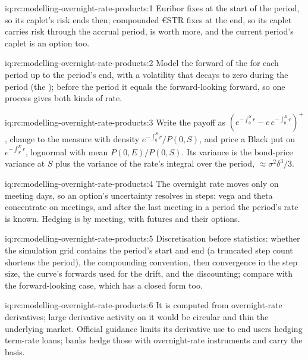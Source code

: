 \begin{solution}{iq:rc:modelling-overnight-rate-products:1}
Euribor fixes at the start of the period, so its caplet's risk ends then;
compounded €STR fixes at the end, so its caplet carries risk through the accrual
period, is worth more, and the current period's caplet is an option too.
\end{solution}

\begin{solution}{iq:rc:modelling-overnight-rate-products:2}
Model the forward of the  for each period up to the period's
end, with a volatility that decays to zero during the period (the ); before the period it equals the forward-looking forward, so
one process gives both kinds of rate.
\end{solution}

\begin{solution}{iq:rc:modelling-overnight-rate-products:3}
Write the payoff as $(e^{-\int_0^Sr}-c\,e^{-\int_0^Er})^+$, change to the measure with
density $e^{-\int_0^Sr}/P(0,S)$, and price a Black put on $e^{-\int_S^Er}$, lognormal with
mean $P(0,E)/P(0,S)$. Its variance is the bond-price variance at $S$ plus the variance
of the rate's integral over the period, $\approx\sigma^2\delta^3/3$.
\end{solution}

\begin{solution}{iq:rc:modelling-overnight-rate-products:4}
The overnight rate moves only on meeting days, so an option's uncertainty resolves in
steps: vega and theta concentrate on meetings, and after the last meeting in a period
the period's rate is known. Hedging is by meeting, with futures and their options.
\end{solution}

\begin{solution}{iq:rc:modelling-overnight-rate-products:5}
Discretisation before statistics: whether the simulation grid contains the period's
start and end (a truncated step count shortens the period), the compounding
convention, then convergence in the step size, the curve's forwards used for the
drift, and the discounting; compare with the forward-looking case, which has a closed
form too.
\end{solution}

\begin{solution}{iq:rc:modelling-overnight-rate-products:6}
It is computed from overnight-rate derivatives; large derivative activity on it would
be circular and thin the underlying market. Official guidance limits its derivative
use to end users hedging term-rate loans; banks hedge those with overnight-rate
instruments and carry the basis.
\end{solution}
